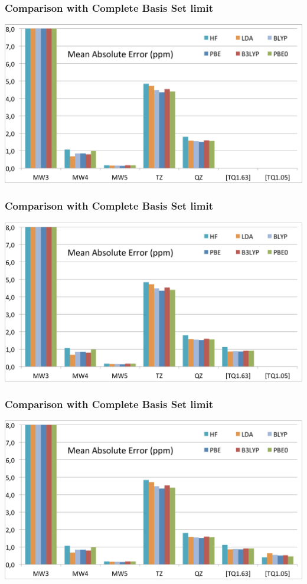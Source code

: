 \begin{frame}
\frametitle{Comparison with Complete Basis Set limit}
\centering
\includegraphics[scale=0.3]{figures/mae_bas_2.pdf}
\end{frame}

\begin{frame}
\frametitle{Comparison with Complete Basis Set limit}
\centering
\includegraphics[scale=0.3]{figures/mae_bas_3.pdf}
\end{frame}

\begin{frame}
\frametitle{Comparison with Complete Basis Set limit}
\centering
\includegraphics[scale=0.3]{figures/mae_bas_4.pdf}
\end{frame}

